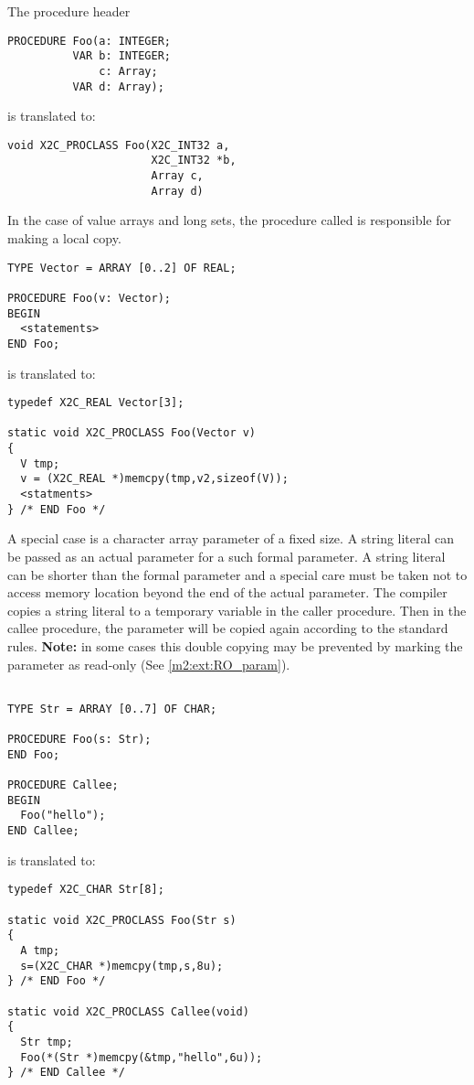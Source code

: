 The procedure header
\begin{verbatim}
PROCEDURE Foo(a: INTEGER;
          VAR b: INTEGER;
              c: Array;
          VAR d: Array);
\end{verbatim}
is translated to:
\begin{verbatim}
void X2C_PROCLASS Foo(X2C_INT32 a,
                      X2C_INT32 *b,
                      Array c,
                      Array d)
\end{verbatim}

In the case of value arrays and long sets, the procedure called is
responsible for making a local copy.
\begin{verbatim}
TYPE Vector = ARRAY [0..2] OF REAL;

PROCEDURE Foo(v: Vector);
BEGIN
  <statements>
END Foo;
\end{verbatim}
is translated to:
\begin{verbatim}
typedef X2C_REAL Vector[3];

static void X2C_PROCLASS Foo(Vector v)
{
  V tmp;
  v = (X2C_REAL *)memcpy(tmp,v2,sizeof(V));
  <statments>
} /* END Foo */
\end{verbatim}

A special case is a character array parameter of a
fixed size. A string literal can be passed as an actual parameter
for a such formal parameter. A string literal can be shorter than
the formal parameter and a special care must be taken not to
access memory location beyond the end of the actual parameter.
The compiler copies a string literal to a temporary variable in the
caller procedure. Then in the callee procedure, the parameter will
be copied again according to the standard rules. {\bf Note:} in
some cases this double copying may be prevented by marking the
parameter as read-only (See \ref{m2:ext:RO_param}).
\begin{verbatim}

TYPE Str = ARRAY [0..7] OF CHAR;

PROCEDURE Foo(s: Str);
END Foo;

PROCEDURE Callee;
BEGIN
  Foo("hello");
END Callee;
\end{verbatim}
is translated to:
\begin{verbatim}
typedef X2C_CHAR Str[8];

static void X2C_PROCLASS Foo(Str s)
{
  A tmp;
  s=(X2C_CHAR *)memcpy(tmp,s,8u);
} /* END Foo */

static void X2C_PROCLASS Callee(void)
{
  Str tmp;
  Foo(*(Str *)memcpy(&tmp,"hello",6u));
} /* END Callee */
\end{verbatim}


